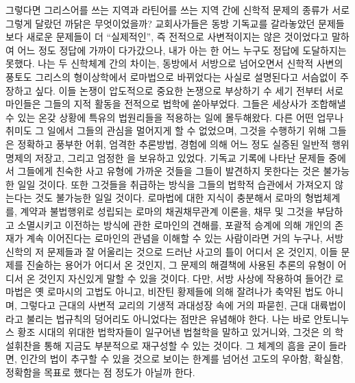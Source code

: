 그렇다면
그리스어를 쓰는 지역과
라틴어를 쓰는 지역 간에
신학적 문제의 종류가 서로 그렇게 달랐던 까닭은 무엇이었을까?
교회사가들은
동방 기독교를 갈라놓았던 문제들보다
새로운 문제들이
더 ``실제적인'',
즉 전적으로 사변적이지는 않은 것이었다고 말하여
어느 정도 정답에 가까이 다가갔으나,
내가 아는 한 어느 누구도 정답에 도달하지는 못했다.
나는
두 신학체계 간의 차이는,
동방에서 서방으로 넘어오면서
신학적 사변의 풍토도
그리스의 형이상학에서 로마법으로 바뀌었다는 사실로
설명된다고
서슴없이 주장하고 싶다.
이들 논쟁이 압도적으로 중요한 논쟁으로 부상하기
수 세기 전부터
서로마인들은 그들의 지적 활동을 전적으로 법학에 쏟아부었다.
그들은
세상사가 조합해낼 수 있는 온갖 상황에
특유의 법원리들을
적용하는 일에 몰두해왔다.
다른 어떤 업무나 취미도
그 일에서 그들의 관심을 멀어지게 할 수 없었으며,
그것을 수행하기 위해 그들은
정확하고 풍부한 어휘,
엄격한 추론방법,
경험에 의해 어느 정도 실증된 일반적 행위 명제의 저장고,
그리고 엄정한 을
보유하고 있었다.
기독교 기록에 나타난 문제들 중에서
그들에게 친숙한 사고 유형에 가까운 것들을
그들이
발견하지 못한다는 것은 불가능한 일일 것이다.
또한 그것들을 취급하는 방식을
그들의 법학적 습관에서 가져오지 않는다는 것도 불가능한 일일 것이다.
로마법에 대한 지식이 충분해서
로마의 형법체계를,
계약과 불법행위로 성립되는 로마의 채권채무관계 이론을,
채무 및 그것을 부담하고 소멸시키고 이전하는 방식에 관한
로마인의 견해를,
포괄적 승계에 의해 개인의 존재가 계속 이어진다는 로마인의 관념을
이해할 수 있는 사람이라면 거의 누구나,
서방 신학의 저 문제들과 잘 어울리는 것으로 드러난 사고의 틀이 어디서 온 것인지,
이들 문제를 진술하는 용어가 어디서 온 것인지,
그 문제의 해결책에 사용된 추론의 유형이 어디서 온 것인지
자신있게 말할 수 있을 것이다.
다만,
서방 사상에 작용하여 들어간 로마법은
옛 로마시의 고법도 아니고,
비잔틴 황제들에 의해 잘려나가 축약된 법도 아니며,
그렇다고 근대의 사변적 교리의 기생적 과대성장 속에 거의 파묻힌,
근대 대륙법이라고 불리는 법규칙의 덩어리도 아니었다는
점만은 유념해야 한다.
나는 바로 안토니누스 황조 시대의 위대한 법학자들이
일구어낸 법철학을 말하고 있거니와,
그것은 의 학설휘찬을 통해 지금도 부분적으로
재구성할 수 있는 것이다.
그 체계의 흠을 굳이 들라면,
인간의 법이 추구할 수 있을 것으로 보이는 한계를 넘어선
고도의 우아함, 확실함, 정확함을
목표로 했다는 점
정도가 아닐까 한다.

